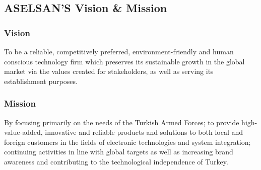 \subsection{ASELSAN'S Vision \& Mission}

\subsubsection{Vision}
\- \indent
	To be a reliable, competitively preferred, environment-friendly and human conscious technology firm which preserves its sustainable growth in the global market via the values created for stakeholders, as well as serving its establishment purposes\cite{aselsan}.

\subsubsection{Mission}
\- \indent
	By focusing primarily on the needs of the Turkish Armed Forces; to provide high-value-added, innovative and reliable products and solutions to both local and foreign customers in the fields of electronic technologies and system integration; continuing activities in line with global targets as well as increasing brand awareness and contributing to the technological independence of Turkey\cite{aselsan}.

​
	
\vfill
	

